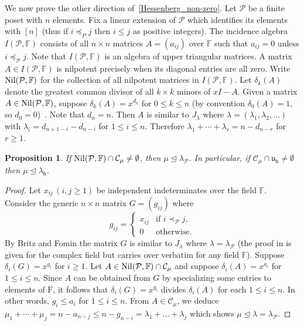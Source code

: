 \documentclass[12pt,a4paper,reqno]{amsart}
\theoremstyle{plain}
\newtheorem{proposition}[theorem]{Proposition}
\theoremstyle{definition}
\newcommand{\less}{\unlhd}
\newcommand{\FF}{{\mathbb{F}}}
\newcommand{\1}{\mathds{1}}
\newcommand{\C}{\mathcal{C}}
\newcommand{\F}{\mathrm{F}}
\renewcommand{\u}{\mathfrak{u}}
\newcommand{\hes}{\mathsf{h}}
\begin{document}
We now prove the other direction of~\cref{Hessenberg_non-zero}. Let $\mathcal{P}$ be a finite poset with $n$ elements. Fix a linear extension of $\mathcal{P}$ which identifies its elements with $[n]$ (thus if $i\preceq_Pj$ then $i\leq j$ as positive integers). The incidence algebra $I(\mathcal{P},\FF)$ consists of all $n\times n$ matrices $A=(a_{ij})$ over $\FF$ such that $a_{ij}=0$ unless $i\preceq_\mathcal{P} j$. Note that $I(\mathcal{P},\FF)$ is an algebra of upper triangular matrices. 
A matrix $A\in I(\mathcal{P},\FF)$ is nilpotent precisely when its diagonal entries are all zero. Write ${\rm Nil}(\mathcal{P},\FF)$ for the collection of all nilpotent matrices in $I(\mathcal{P},\FF)$. Let $\delta_k(A)$ denote the greatest common divisor of all $k\times k$ minors of $xI-A$. Given a matrix $A\in {\rm Nil}(\mathcal{P},\FF)$, suppose $\delta_k(A)=x^{d_k}$ for $0\leq k\leq n$ (by convention $\delta_0(A)=1$, so $d_0=0$)~\cite[Lemma 6.2]{MR1814900}. Note that $d_n=n$. Then $A$ is similar to $J_\lambda$ where $\lambda=(\lambda_1,\lambda_2,\ldots)$ with $\lambda_i=d_{n+1-i}-d_{n-i}$ for $1\leq i\leq n$. Therefore $\lambda_1+\cdots+\lambda_r=n-d_{n-r}$ for $r\geq 1$. 
\begin{proposition}\label{thm:dominated}
 If ${\rm Nil}(\mathcal{P},\FF)\cap \C_\mu\neq \emptyset$, then $\mu\less \lambda_\mathcal{P}$. In particular, if $ \mathcal{C}_\mu\cap\u_\hes  \neq \emptyset$ then $\mu \less \lambda_\hes$.
\end{proposition}
\begin{proof}
  Let $x_{ij} \,(i,j\geq 1)$ be independent indeterminates over the field $\FF$. Consider the generic $n\times n$ matrix $G=(g_{ij})$ where
  $$
  g_{ij}=
  \begin{cases}
    x_{ij} & \mbox{if } i\prec_\mathcal{P} j,\\
    0 & \mbox{otherwise.}
  \end{cases}
  $$ 
By Britz and Fomin \cite[Theorem 6.1]{MR1814900} the matrix $G$ is similar to $J_\lambda$ where $\lambda=\lambda_\mathcal{P}$ (the proof in \cite{MR1814900} is given for the complex field but carries over verbatim for any field $\FF$). Suppose $\delta_i(G)=x^{g_i}$ for $i\geq 1$. Let $A\in {\rm Nil}(\mathcal{P},\FF)\cap \C_\mu$ and suppose $\delta_i(A)=x^{a_i}$ for $1\leq i\leq n$. Since $A$ can be obtained from $G$ by specializing some entries to elements of $\F$, it follows that $\delta_i(G)=x^{g_i}$ divides $\delta_i(A)$ for each $1\leq i\leq n$. In other words, $g_i\leq a_i$ for $1\leq i\leq n$. From $A\in \C_\mu$, we deduce $\mu_1+\cdots+\mu_j=n-a_{n-j}\leq n-g_{n-i}=\lambda_1+\dots+\lambda_j$ which shows $\mu\less \lambda=\lambda_{\mathcal{P}}$. 
\end{proof}
\end{document}
